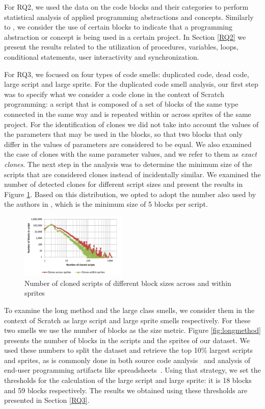 \documentclass{sig-alternate}
\begin{document}
For RQ2, we used the data on the code blocks and their categories to perform statistical analysis of applied programming abstractions and concepts. Similarly to \cite{Maloney_2008}, we consider the use of certain blocks to indicate that a programming abstraction or concept is being used in a certain project. In Section \ref{RQ2} we present the results related to the utilization of procedures, variables, loops, conditional statements, user interactivity and synchronization.

For RQ3, we focused on four types of code smells: duplicated code, dead code, large script and large sprite. For the duplicated code smell analysis, our first step was to specify what we consider a code clone in the context of Scratch programming: a script that is composed of a set of blocks of the same type connected in the same way and is repeated within or across sprites of the same project. For the identification of clones we did not take into account the values of the parameters that may be used in the blocks, so that two blocks that only differ in the values of parameters are considered to be equal. We also examined the case of clones with the same parameter values, and we refer to them as \textit{exact clones}. The next step in the analysis was to determine the minimum size of the scripts that are considered clones instead of incidentally similar. We examined the number of detected clones for different script sizes and present the results in Figure \ref{fig:cloneslines}. Based on this distribution, we opted to adopt the number also used by the authors in \cite{moreno_automatic_2014}, which is the minimum size of 5 blocks per script.

\begin{figure}
	\centering
	\includegraphics[width=0.45\textwidth]{fig/charts/11cloneslines}
	\vspace{-1em}
	\caption{Number of cloned scripts of different block sizes across and within sprites}
	\label{fig:cloneslines}
\end{figure}

To examine the long method and the large class smells, we consider them in the context of Scratch as large script and large sprite smells respectively. For these two smells we use the number of blocks as the size metric. Figure \ref{fig:longmethod} presents the number of blocks in the scripts and the sprites of our dataset. We used these numbers to split the dataset and retrieve the top 10\% largest scripts and sprites, as is commonly done in both source code analysis~\cite{alves_deriving_2010} and analysis of end-user programming artifacts like spreadsheets~\cite{hermans2015detecting}. Using that strategy, we set the thresholds for the calculation of the large script and large sprite: it is 18 blocks and 59 blocks respectively. The results we obtained using these thresholds are presented in Section \ref{RQ3}.
\end{document}

